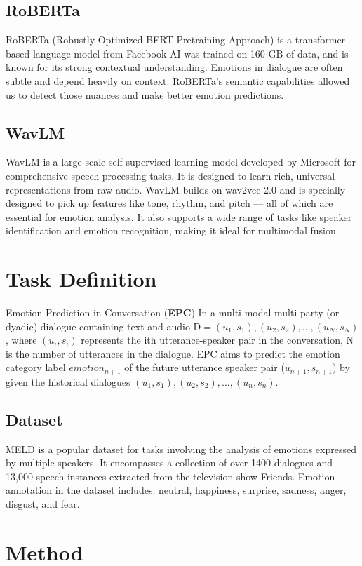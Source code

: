\documentclass{article}
\begin{document}
\subsection{RoBERTa}
RoBERTa (Robustly Optimized BERT Pretraining Approach) \cite{liu2019roberta} is a transformer-based language model from Facebook AI was trained on 160 GB of data, and is known for its strong contextual understanding.
Emotions in dialogue are often subtle and depend heavily on context. RoBERTa’s semantic capabilities allowed us to detect those nuances and make better emotion predictions.
\subsection{WavLM}
WavLM \cite{chen2021wavlm} is a large-scale self-supervised learning model developed by Microsoft for comprehensive speech processing tasks. It is designed to learn rich, universal representations from raw audio.
WavLM builds on wav2vec 2.0 and is specially designed to pick up features like tone, rhythm, and pitch — all of which are essential for emotion analysis.
It also supports a wide range of tasks like speaker identification and emotion recognition, making it ideal for multimodal fusion.


\section{ Task Definition}
Emotion Prediction in Conversation (\textbf{EPC}) In a multi-modal
multi-party (or dyadic) dialogue containing text and audio
$\mathrm{D} = {(u_1, s_1), (u_2, s_2), ..., (u_N, s_N)}$, where $(u_i, s_i)$ represents
the ith utterance-speaker pair in the conversation, N is
the number of utterances in the dialogue. EPC aims to predict
the emotion category label $emotion_{n+1}$ of the future utterance
speaker pair ($u_{n+1}, s_{n+1}$) by given the historical dialogues
${(u_1, s_1), (u_2, s_2), ..., (u_n, s_n)}$.

\subsection{Dataset}
MELD is a popular dataset for
tasks involving the analysis of emotions expressed by multiple
speakers. It encompasses a collection of over 1400 dialogues
and 13,000 speech instances extracted from the television show
Friends. Emotion annotation in the dataset includes: neutral,
happiness, surprise, sadness, anger, disgust, and fear.

\section{Method}
\end{document}
